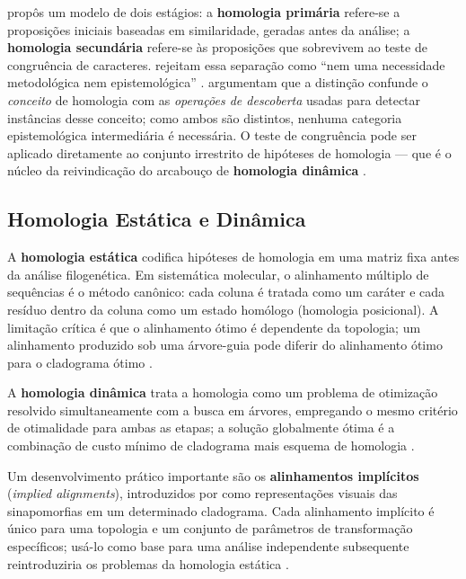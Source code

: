 \textcite{depinna1991} propôs um modelo de dois estágios: a \textbf{homologia primária} refere-se a proposições iniciais baseadas em similaridade, geradas antes da análise; a \textbf{homologia secundária} refere-se às proposições que sobrevivem ao teste de congruência de caracteres. \textcite{wheeleretal2006} rejeitam essa separação como ``nem uma necessidade metodológica nem epistemológica'' \parencite[p.~10]{wheeleretal2006}. \textcite{grant2004ts} argumentam que a distinção confunde o \textit{conceito} de homologia com as \textit{operações de descoberta} usadas para detectar instâncias desse conceito; como ambos são distintos, nenhuma categoria epistemológica intermediária é necessária. O teste de congruência pode ser aplicado diretamente ao conjunto irrestrito de hipóteses de homologia --- que é o núcleo da reivindicação do arcabouço de \textbf{homologia dinâmica} \parencite{wheeler2001a,wheeler2001b}.

\subsection{Homologia Estática e Dinâmica}

A \textbf{homologia estática} codifica hipóteses de homologia em uma matriz fixa antes da análise filogenética. Em sistemática molecular, o alinhamento múltiplo de sequências é o método canônico: cada coluna é tratada como um caráter e cada resíduo dentro da coluna como um estado homólogo (homologia posicional). A limitação crítica é que o alinhamento ótimo é dependente da topologia; um alinhamento produzido sob uma árvore-guia pode diferir do alinhamento ótimo para o cladograma ótimo \parencite{wheeleretal2006}.

A \textbf{homologia dinâmica} trata a homologia como um problema de otimização resolvido simultaneamente com a busca em árvores, empregando o mesmo critério de otimalidade para ambas as etapas; a solução globalmente ótima é a combinação de custo mínimo de cladograma mais esquema de homologia \parencite{wheeleretal2006}.

Um desenvolvimento prático importante são os \textbf{alinhamentos implícitos} (\textit{implied alignments}), introduzidos por \textcite{wheeler2003a} como representações visuais das sinapomorfias em um determinado cladograma. Cada alinhamento implícito é único para uma topologia e um conjunto de parâmetros de transformação específicos; usá-lo como base para uma análise independente subsequente reintroduziria os problemas da homologia estática \parencite{wheeleretal2006}.

